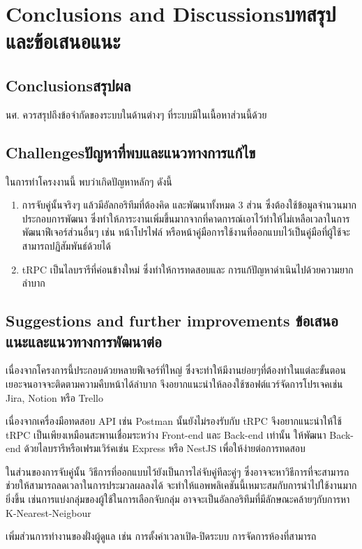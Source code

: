 \chapter{\ifenglish Conclusions and Discussions\else บทสรุปและข้อเสนอแนะ\fi}

\section{\ifenglish Conclusions\else สรุปผล\fi}

นศ. ควรสรุปถึงข้อจำกัดของระบบในด้านต่างๆ ที่ระบบมีในเนื้อหาส่วนนี้ด้วย

\section{\ifenglish Challenges\else ปัญหาที่พบและแนวทางการแก้ไข\fi}

ในการทำโครงงานนี้ พบว่าเกิดปัญหาหลักๆ ดังนี้
\begin{enumerate}
  \item การจับคู่นั้นจริงๆ แล้วมีอัลกอริทึมที่ต้องคิด และพัฒนาทั้งหมด 3 ส่วน ซึ่งต้องใช้ข้อมูลจำนวนมากประกอบการพัฒนา
        ซึ่งทำให้ภาระงานเพิ่มขึ้นมากจากที่คาดการณ์เอาไว้ทำให้ไม่เหลือเวลาในการพัฒนาฟีเจอร์ส่วนอื่นๆ เช่น หน้าโปรไฟล์ หรือหน้าคู่มือการใช้งานที่ออกแบบไว้เป็นคู่มือที่ผู้ใช้จะสามารถปฏิสัมพันธ์ด้วยได้
  \item tRPC เป็นไลบรารีที่ค่อนข้างใหม่ ซึ่งทำให้การทดสอบและ การแก้ปัญหาดำเนินไปด้วยความยากลำบาก
\end{enumerate}


\section{\ifenglish%
Suggestions and further improvements
\else%
ข้อเสนอแนะและแนวทางการพัฒนาต่อ
\fi
}
เนื่องจากโครงการนี้ประกอบด้วยหลายฟีเจอร์ที่ใหญ่ ซึ่งจะทำให้มีงานย่อยๆที่ต้องทำในแต่ละขั้นตอนเยอะจนอาจจะติดตามความคืบหน้าได้ลำบาก
จึงอยากแนะนำให้ลองใช้ซอฟต์แวร์จัดการโปรเจคเช่น Jira, Notion หรือ Trello

เนื่องจากเครื่องมือทดสอบ API เช่น Postman นั้นยังไม่รองรับกับ tRPC จึงอยากแนะนำให้ใช้ tRPC เป็นเพียงเหมือนสะพานเชื่อมระหว่าง Front-end
และ Back-end เท่านั้น ให้พัฒนา Back-end ด้วยไลบรารีหรือเฟรมเวิร์คเช่น Express หรือ NestJS เพื่อให้ง่ายต่อการทดสอบ

ในส่วนของการจับคู่นั้น วิธีการที่ออกแบบไว้ยังเป็นการไล่จับคู่ทีละคู่ๆ ซึ่งอาจจะหาวิธีการที่จะสามารถช่วยให้สามารถลดเวลาในการประมวลผลลงได้ 
จะทำให้แอพพลิเคชันนี้เหมาะสมกับการนำไปใช้งานมากยิ่งขึ้น เช่นการแบ่งกลุ่มของผู้ใช้ในการเลือกจับกลุ่ม อาจจะเป็นอัลกอริทึมที่มีลักษณะคล้ายๆกับการหา 
K-Nearest-Neigbour

เพิ่มส่วนการทำงานของฝั่งผู้ดูแล เช่น การตั้งค่าเวลาเปิด-ปิดระบบ การจัดการห้องที่สามารถ
